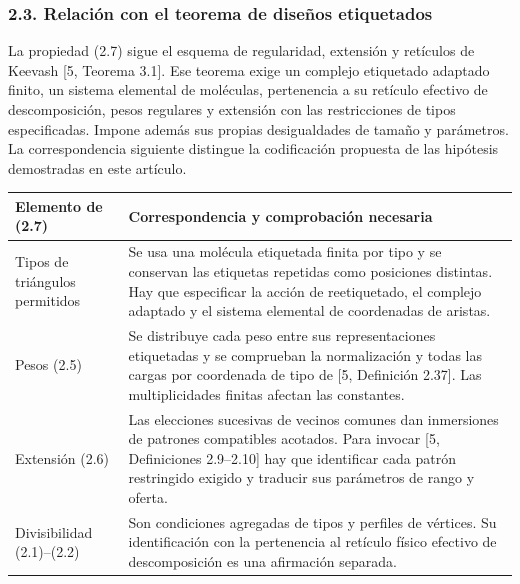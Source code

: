 \documentclass[spanish,11pt,a4paper]{article}
\begin{document}
\subsubsection{2.3. Relación con el teorema de diseños etiquetados}\label{relaciuxf3n-con-el-teorema-de-diseuxf1os-etiquetados}

La propiedad (2.7) sigue el esquema de regularidad, extensión y retículos de Keevash {[}5, Teorema 3.1{]}. Ese teorema exige un complejo etiquetado adaptado finito, un sistema elemental de moléculas, pertenencia a su retículo efectivo de descomposición, pesos regulares y extensión con las restricciones de tipos especificadas. Impone además sus propias desigualdades de tamaño y parámetros. La correspondencia siguiente distingue la codificación propuesta de las hipótesis demostradas en este artículo.

{\begin{longtable}[]{@{}
  >{\raggedright\arraybackslash}p{}
  >{\raggedright\arraybackslash}p{}@{}}
\toprule\noalign{}
\begin{minipage}[b]{\linewidth}\raggedright
Elemento de (2.7)
\end{minipage} & \begin{minipage}[b]{\linewidth}\raggedright
Correspondencia y comprobación necesaria
\end{minipage} \\
\midrule\noalign{}
\endhead
\bottomrule\noalign{}
\endlastfoot
Tipos de triángulos permitidos & Se usa una molécula etiquetada finita por tipo y se conservan las etiquetas repetidas como posiciones distintas. Hay que especificar la acción de reetiquetado, el complejo adaptado y el sistema elemental de coordenadas de aristas. \\
Pesos (2.5) & Se distribuye cada peso entre sus representaciones etiquetadas y se comprueban la normalización y todas las cargas por coordenada de tipo de {[}5, Definición 2.37{]}. Las multiplicidades finitas afectan las constantes. \\
Extensión (2.6) & Las elecciones sucesivas de vecinos comunes dan inmersiones de patrones compatibles acotados. Para invocar {[}5, Definiciones 2.9--2.10{]} hay que identificar cada patrón restringido exigido y traducir sus parámetros de rango y oferta. \\
Divisibilidad (2.1)--(2.2) & Son condiciones agregadas de tipos y perfiles de vértices. Su identificación con la pertenencia al retículo físico efectivo de descomposición es una afirmación separada. \\
\end{longtable}
}
\end{document}
